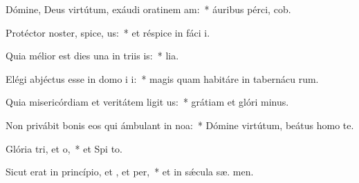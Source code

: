 \item Dómine, Deus virtútum, exáudi oratinem am:~* áuribus pérci,  cob.
\item Protéctor noster, spice, us:~* et réspice in fáci  i.
\item Quia mélior est dies una in triis is:~*  lia.
\item Elégi abjéctus esse in domo i i:~* magis quam habitáre in tabernácu rum.
\item Quia misericórdiam et veritátem ligit us:~* grátiam et glóri  minus.
\item Non privábit bonis eos qui ámbulant in noa:~* Dómine virtútum, beátus homo    te.
\item Glória tri, et o,~* et Spi to.
\item Sicut erat in princípio, et , et per,~* et in sǽcula sæ. men.
